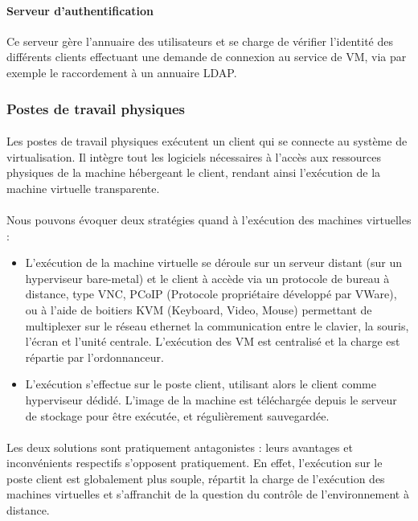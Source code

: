 \paragraph{Serveur d'authentification} Ce serveur gère l'annuaire des
utilisateurs et se charge de vérifier l'identité des différents clients
effectuant une demande de connexion au service de VM, via par exemple le
raccordement à un annuaire LDAP.

\subsubsection{Postes de travail physiques}

\paragraph{} Les postes de travail physiques exécutent un client qui se connecte
au système de virtualisation. Il intègre tout les logiciels nécessaires à
l'accès aux ressources physiques de la machine hébergeant le client, rendant
ainsi l'exécution de la machine virtuelle transparente.

\paragraph{} Nous pouvons évoquer deux stratégies quand à l'exécution des
machines virtuelles :

\begin{itemize}
\item L'exécution de la machine virtuelle se déroule sur un serveur distant (sur
un hyperviseur bare-metal) et le client à accède via un protocole de bureau à
distance, type VNC, PCoIP (Protocole propriétaire développé par VWare), ou à
l'aide de boitiers KVM (Keyboard, Video, Mouse) permettant de multiplexer sur le
réseau ethernet la communication entre le clavier, la souris, l'écran et l'unité
centrale. L'exécution des VM est centralisé et la charge est répartie par
l'ordonnanceur.
\item L'exécution s'effectue sur le poste client, utilisant alors le client
comme hyperviseur dédidé. L'image de la machine est téléchargée depuis le
serveur de stockage pour être exécutée, et régulièrement sauvegardée.
\end{itemize}

\paragraph{} Les deux solutions sont pratiquement antagonistes : leurs avantages
et inconvénients respectifs s'opposent pratiquement. En effet, l'exécution
sur le poste client est globalement plus souple, répartit la charge de
l'exécution des machines virtuelles et s'affranchit de la question du contrôle
de l'environnement à distance.


